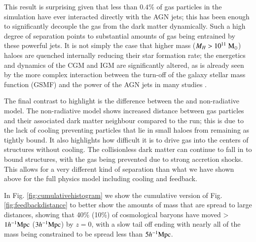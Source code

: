 This result is surprising given that less than $0.4\%$ of gas particles in
the simulation have ever interacted directly with the AGN jets; this has been
enough to significantly decouple the gas from the dark matter dynamically.
Such a high degree of separation points to substantial amounts of gas being
entrained by these powerful jets. It is not simply the case that higher mass
($M_H > 10^{11} \;{\rm M}_{\odot}{}$) haloes are quenched internally reducing their star
formation rate; the energetics and dynamics of the CGM and IGM are
significantly altered, as is already seen by the more complex interaction
between the turn-off of the galaxy stellar mass function (GSMF) and the power
of the AGN jets in many studies \citep{Weinberger2018, Dave2019}. 

The final contrast to highlight is the difference between the \nojet{} and
non-radiative model. The non-radiative model shows increased distance between
gas particles and their associated dark matter neighbour compared to the
\nojet{} run; this is due to the lack of cooling preventing particles that
lie in small haloes from remaining as tightly bound. It also highlights how
difficult it is to drive gas into the centers of structures without cooling.
The collisionless dark matter can continue to fall in to bound structures,
with the gas being prevented due to strong accretion shocks. This allows for
a very different kind of separation than what we have shown above for the
full physics model including cooling and feedback.


In Fig. \ref{fig:cumulativehistogram} we show the cumulative version of Fig.
\ref{fig:feedbackdistance} to better show the amounts of mass that are spread
to large distances, showing that 40\% (10\%) of cosmological baryons have
moved > $1h^{-1}{\rm Mpc}{}$ ($3h^{-1}{\rm Mpc}{}$) by $z = 0$, with a slow tail off ending with
nearly all of the mass being constrained to be spread less than $5h^{-1}{\rm Mpc}{}$.


